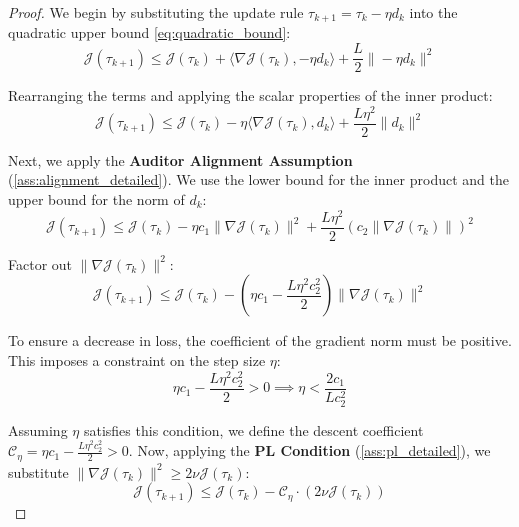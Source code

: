 \documentclass{article}
\theoremstyle{plain}
\theoremstyle{definition}
\theoremstyle{remark}
\begin{document}
\begin{proof}
    We begin by substituting the update rule $\tau_{k+1} = \tau_k - \eta d_k$ into the quadratic upper bound \eqref{eq:quadratic_bound}:
    \begin{equation}
        \mathcal{J}(\tau_{k+1}) \le \mathcal{J}(\tau_k) + \langle \nabla \mathcal{J}(\tau_k), -\eta d_k \rangle + \frac{L}{2} \| -\eta d_k \|^2
    \end{equation}
    
    Rearranging the terms and applying the scalar properties of the inner product:
    \begin{equation}
        \mathcal{J}(\tau_{k+1}) \le \mathcal{J}(\tau_k) - \eta \langle \nabla \mathcal{J}(\tau_k), d_k \rangle + \frac{L \eta^2}{2} \| d_k \|^2
    \end{equation}
    
    Next, we apply the \textbf{Auditor Alignment Assumption} (\ref{ass:alignment_detailed}). We use the lower bound for the inner product and the upper bound for the norm of $d_k$:
    \begin{equation}
        \mathcal{J}(\tau_{k+1}) \le \mathcal{J}(\tau_k) - \eta c_1 \| \nabla \mathcal{J}(\tau_k) \|^2 + \frac{L \eta^2}{2} (c_2 \| \nabla \mathcal{J}(\tau_k) \|)^2
    \end{equation}
    
    Factor out $\| \nabla \mathcal{J}(\tau_k) \|^2$:
    \begin{equation}
        \mathcal{J}(\tau_{k+1}) \le \mathcal{J}(\tau_k) - \left( \eta c_1 - \frac{L \eta^2 c_2^2}{2} \right) \| \nabla \mathcal{J}(\tau_k) \|^2
    \end{equation}
    
    To ensure a decrease in loss, the coefficient of the gradient norm must be positive. This imposes a constraint on the step size $\eta$:
    \begin{equation}
        \eta c_1 - \frac{L \eta^2 c_2^2}{2} > 0 \implies \eta < \frac{2 c_1}{L c_2^2}
    \end{equation}
    
    Assuming $\eta$ satisfies this condition, we define the descent coefficient $\mathcal{C}_\eta = \eta c_1 - \frac{L \eta^2 c_2^2}{2} > 0$.
    Now, applying the \textbf{PL Condition} (\ref{ass:pl_detailed}), we substitute $\| \nabla \mathcal{J}(\tau_k) \|^2 \ge 2\nu \mathcal{J}(\tau_k)$:
    \begin{equation}
        \mathcal{J}(\tau_{k+1}) \le \mathcal{J}(\tau_k) - \mathcal{C}_\eta \cdot (2\nu \mathcal{J}(\tau_k))
    \end{equation}
    

\end{proof}
\end{document}
